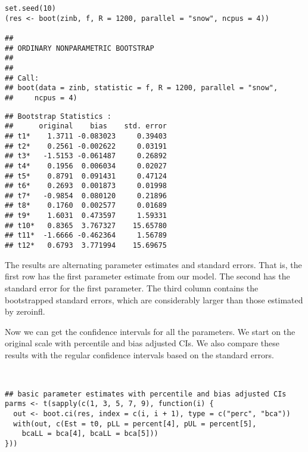 \documentclass[MASTER.tex]{subfiles}
\begin{document}
\begin{frame}[fragile]
	\begin{verbatim}
set.seed(10)
(res <- boot(zinb, f, R = 1200, parallel = "snow", ncpus = 4))
 
## 
## ORDINARY NONPARAMETRIC BOOTSTRAP
## 
## 
## Call:
## boot(data = zinb, statistic = f, R = 1200, parallel = "snow", 
##     ncpus = 4)
\end{verbatim}
\end{frame}
\begin{frame}[fragile]
	\begin{verbatim}
## Bootstrap Statistics :
##      original    bias    std. error
## t1*    1.3711 -0.083023     0.39403
## t2*    0.2561 -0.002622     0.03191
## t3*   -1.5153 -0.061487     0.26892
## t4*    0.1956  0.006034     0.02027
## t5*    0.8791  0.091431     0.47124
## t6*    0.2693  0.001873     0.01998
## t7*   -0.9854  0.080120     0.21896
## t8*    0.1760  0.002577     0.01689
## t9*    1.6031  0.473597     1.59331
## t10*   0.8365  3.767327    15.65780
## t11*  -1.6666 -0.462364     1.56789
## t12*   0.6793  3.771994    15.69675
\end{verbatim}
\end{frame}
\begin{frame}[fragile]

The results are alternating parameter estimates and standard errors. That is, the first row has the first parameter estimate from our model. The second has the standard error for the first parameter. The third column contains the bootstrapped standard errors, which are considerably larger than those estimated by zeroinfl.

Now we can get the confidence intervals for all the parameters. We start on the original scale with percentile and bias adjusted CIs. We also compare these results with the regular confidence intervals based on the standard errors.

\end{frame}
\begin{frame}[fragile]
	\begin{verbatim}


## basic parameter estimates with percentile and bias adjusted CIs
parms <- t(sapply(c(1, 3, 5, 7, 9), function(i) {
  out <- boot.ci(res, index = c(i, i + 1), type = c("perc", "bca"))
  with(out, c(Est = t0, pLL = percent[4], pUL = percent[5],
    bcaLL = bca[4], bcaLL = bca[5]))
}))
\end{verbatim}
\end{frame}
\end{document}
